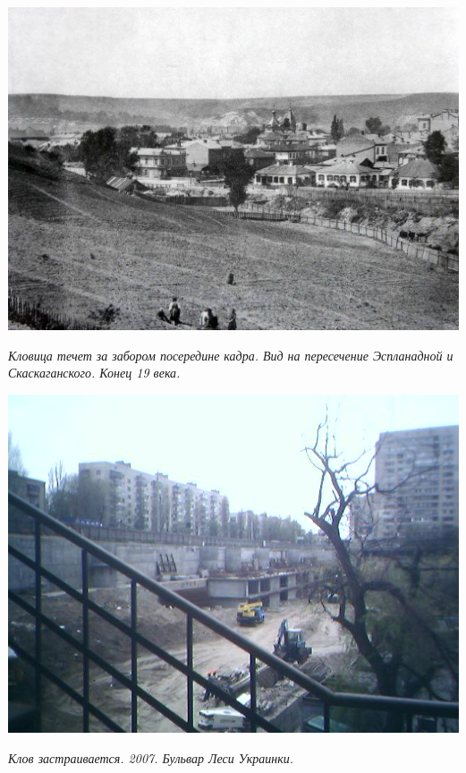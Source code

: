 \newpage
\vspace*{\fill}
\begin{center}
\includegraphics[width=\linewidth]{rpix/klov-esp.jpg}

\textit{Кловица течет за забором посередине кадра. Вид на пересечение Эспланадной и Скаскаганского. Конец 19 века.}
\end{center}
\vspace*{\fill}

\newpage


\begin{center}
\includegraphics[width=0.93\linewidth]{rpix/25-04-07_1552.jpg}

\textit{Клов застраивается. 2007. Бульвар Леси Украинки.}
\end{center}


